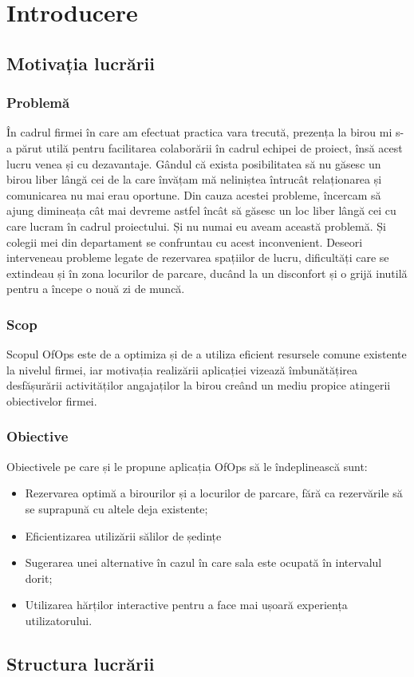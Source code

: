 \chapter{Introducere}

\section{Motivația lucrării}
\subsection{Problemă}
În cadrul firmei în care am efectuat practica vara trecută, prezența la birou mi s-a părut utilă pentru facilitarea colaborării în cadrul echipei de proiect, însă acest lucru venea și cu dezavantaje. Gândul că exista posibilitatea să nu găsesc un birou liber lângă cei de la care învățam mă neliniștea întrucât relaționarea și comunicarea nu mai erau oportune. Din cauza acestei probleme, încercam să ajung dimineața cât mai devreme astfel încât să găsesc un loc liber lângă cei cu care lucram în cadrul proiectului. Și nu numai eu aveam această problemă. Și colegii mei din departament se confruntau cu acest inconvenient. Deseori interveneau probleme legate de rezervarea spațiilor de lucru,  dificultăți care se extindeau și în zona locurilor de parcare, ducând la un disconfort și o grijă inutilă pentru a începe o nouă zi de muncă.

\subsection{Scop}
Scopul OfOps este de a optimiza și de a utiliza  eficient resursele comune existente la nivelul firmei, iar motivația realizării aplicației vizează îmbunătățirea desfășurării activităților angajaților la birou creând un mediu propice atingerii obiectivelor firmei.

\subsection{Obiective}
Obiectivele pe care și le propune aplicația OfOps să le îndeplinească sunt:
    \begin{itemize}[left=1.5cm]
         \item Rezervarea optimă a birourilor și a locurilor de parcare, fără ca rezervările să se suprapună cu altele deja existente;
        \item Eficientizarea utilizării sălilor de ședințe
        \item Sugerarea unei alternative în cazul în care sala este ocupată în intervalul dorit;
        \item Utilizarea hărților interactive pentru a face mai ușoară experiența utilizatorului.
    \end{itemize}


\section{Structura lucrării}

